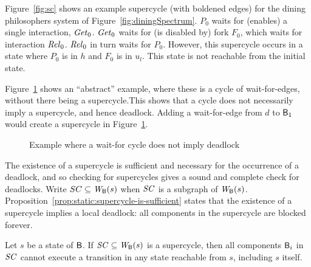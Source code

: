 Figure~\ref{fig:sc} shows an example supercycle (with boldened edges) for the dining philosophers
system of Figure~\ref{fig:diningSpectrum}.
$P_0$ waits for (enables) a single interaction, $\mathit{Get}_0$. 
$\mathit{Get}_0$ waits for (is disabled by) fork $F_0$, which waits for interaction $\mathit{Rel}_0$.
$\mathit{Rel}_0$ in turn waits for $P_0$. However, this supercycle occurs in a state where $P_0$ is in $h$
and $F_0$ is in $u_l$. This state is not reachable from the initial state. 



Figure~\ref{fig:cycleOK} shows an ``abstract'' example, where these is
a cycle of wait-for-edges, without there being a supercycle.This shows
that a cycle does not necessarily imply a supercycle, and hence
deadlock. Adding a wait-for-edge from $d$ to $\mathsf{B}_1$ would create a
supercycle in Figure~\ref{fig:cycleOK}.
%
\begin{figure}[ht]
\begin{center}
\scalebox{0.5}{}
\caption{Example where a wait-for cycle does not imply deadlock}
\label{fig:cycleOK}
\end{center}
\end{figure}






The existence of a supercycle is sufficient and necessary for the occurrence of
a deadlock, and so checking for supercycles gives a sound and complete check for
deadlocks.  Write $SC \subseteq \mathit{W}_{\mathsf{B}}({s})$ when $\mathit{SC}$ is a subgraph of $\mathit{W}_{\mathsf{B}}({s})$.
%
Proposition~\ref{prop:static:supercycle-is-sufficient} states that the
existence of a supercycle implies a local deadlock: all components in
the supercycle are blocked forever.

\bp
\label{prop:static:supercycle-is-sufficient}
Let $s$ be a state of $\mathsf{B}$.
If $\mathit{SC} \subseteq \mathit{W}_{\mathsf{B}}({s})$ is a supercycle, then all components $\mathsf{B}_i$ in $\mathit{SC}$ cannot execute a transition in any state reachable
from $s$, including $s$ itself.
\ep
%

